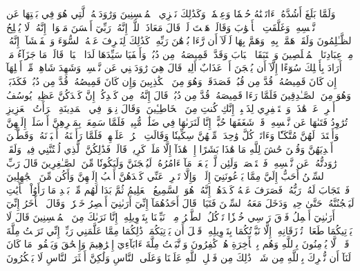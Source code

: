 وَلَمَّا بَلَغَ أَشُدَّهُۥٓ ءَاتَيۡنَٰهُ حُكۡمٗا وَعِلۡمٗاۚ وَكَذَٰلِكَ نَجۡزِي ٱلۡمُحۡسِنِينَ
وَرَٰوَدَتۡهُ ٱلَّتِي هُوَ فِي بَيۡتِهَا عَن نَّفۡسِهِۦ وَغَلَّقَتِ ٱلۡأَبۡوَٰبَ وَقَالَتۡ هَيۡتَ لَكَۚ قَالَ مَعَاذَ ٱللَّهِۖ إِنَّهُۥ رَبِّيٓ أَحۡسَنَ مَثۡوَايَۖ إِنَّهُۥ لَا يُفۡلِحُ ٱلظَّـٰلِمُونَ
وَلَقَدۡ هَمَّتۡ بِهِۦۖ وَهَمَّ بِهَا لَوۡلَآ أَن رَّءَا بُرۡهَٰنَ رَبِّهِۦۚ كَذَٰلِكَ لِنَصۡرِفَ عَنۡهُ ٱلسُّوٓءَ وَٱلۡفَحۡشَآءَۚ إِنَّهُۥ مِنۡ عِبَادِنَا ٱلۡمُخۡلَصِينَ
وَٱسۡتَبَقَا ٱلۡبَابَ وَقَدَّتۡ قَمِيصَهُۥ مِن دُبُرٖ وَأَلۡفَيَا سَيِّدَهَا لَدَا ٱلۡبَابِۚ قَالَتۡ مَا جَزَآءُ مَنۡ أَرَادَ بِأَهۡلِكَ سُوٓءًا إِلَّآ أَن يُسۡجَنَ أَوۡ عَذَابٌ أَلِيمٞ
قَالَ هِيَ رَٰوَدَتۡنِي عَن نَّفۡسِيۚ وَشَهِدَ شَاهِدٞ مِّنۡ أَهۡلِهَآ إِن كَانَ قَمِيصُهُۥ قُدَّ مِن قُبُلٖ فَصَدَقَتۡ وَهُوَ مِنَ ٱلۡكَٰذِبِينَ
وَإِن كَانَ قَمِيصُهُۥ قُدَّ مِن دُبُرٖ فَكَذَبَتۡ وَهُوَ مِنَ ٱلصَّـٰدِقِينَ
فَلَمَّا رَءَا قَمِيصَهُۥ قُدَّ مِن دُبُرٖ قَالَ إِنَّهُۥ مِن كَيۡدِكُنَّۖ إِنَّ كَيۡدَكُنَّ عَظِيمٞ
يُوسُفُ أَعۡرِضۡ عَنۡ هَٰذَاۚ وَٱسۡتَغۡفِرِي لِذَنۢبِكِۖ إِنَّكِ كُنتِ مِنَ ٱلۡخَاطِـِٔينَ
۞وَقَالَ نِسۡوَةٞ فِي ٱلۡمَدِينَةِ ٱمۡرَأَتُ ٱلۡعَزِيزِ تُرَٰوِدُ فَتَىٰهَا عَن نَّفۡسِهِۦۖ قَدۡ شَغَفَهَا حُبًّاۖ إِنَّا لَنَرَىٰهَا فِي ضَلَٰلٖ مُّبِينٖ
فَلَمَّا سَمِعَتۡ بِمَكۡرِهِنَّ أَرۡسَلَتۡ إِلَيۡهِنَّ وَأَعۡتَدَتۡ لَهُنَّ مُتَّكَـٔٗا وَءَاتَتۡ كُلَّ وَٰحِدَةٖ مِّنۡهُنَّ سِكِّينٗا وَقَالَتِ ٱخۡرُجۡ عَلَيۡهِنَّۖ فَلَمَّا رَأَيۡنَهُۥٓ أَكۡبَرۡنَهُۥ وَقَطَّعۡنَ أَيۡدِيَهُنَّ وَقُلۡنَ حَٰشَ لِلَّهِ مَا هَٰذَا بَشَرًا إِنۡ هَٰذَآ إِلَّا مَلَكٞ كَرِيمٞ
قَالَتۡ فَذَٰلِكُنَّ ٱلَّذِي لُمۡتُنَّنِي فِيهِۖ وَلَقَدۡ رَٰوَدتُّهُۥ عَن نَّفۡسِهِۦ فَٱسۡتَعۡصَمَۖ وَلَئِن لَّمۡ يَفۡعَلۡ مَآ ءَامُرُهُۥ لَيُسۡجَنَنَّ وَلَيَكُونٗا مِّنَ ٱلصَّـٰغِرِينَ
قَالَ رَبِّ ٱلسِّجۡنُ أَحَبُّ إِلَيَّ مِمَّا يَدۡعُونَنِيٓ إِلَيۡهِۖ وَإِلَّا تَصۡرِفۡ عَنِّي كَيۡدَهُنَّ أَصۡبُ إِلَيۡهِنَّ وَأَكُن مِّنَ ٱلۡجَٰهِلِينَ
فَٱسۡتَجَابَ لَهُۥ رَبُّهُۥ فَصَرَفَ عَنۡهُ كَيۡدَهُنَّۚ إِنَّهُۥ هُوَ ٱلسَّمِيعُ ٱلۡعَلِيمُ
ثُمَّ بَدَا لَهُم مِّنۢ بَعۡدِ مَا رَأَوُاْ ٱلۡأٓيَٰتِ لَيَسۡجُنُنَّهُۥ حَتَّىٰ حِينٖ
وَدَخَلَ مَعَهُ ٱلسِّجۡنَ فَتَيَانِۖ قَالَ أَحَدُهُمَآ إِنِّيٓ أَرَىٰنِيٓ أَعۡصِرُ خَمۡرٗاۖ وَقَالَ ٱلۡأٓخَرُ إِنِّيٓ أَرَىٰنِيٓ أَحۡمِلُ فَوۡقَ رَأۡسِي خُبۡزٗا تَأۡكُلُ ٱلطَّيۡرُ مِنۡهُۖ نَبِّئۡنَا بِتَأۡوِيلِهِۦٓۖ إِنَّا نَرَىٰكَ مِنَ ٱلۡمُحۡسِنِينَ
قَالَ لَا يَأۡتِيكُمَا طَعَامٞ تُرۡزَقَانِهِۦٓ إِلَّا نَبَّأۡتُكُمَا بِتَأۡوِيلِهِۦ قَبۡلَ أَن يَأۡتِيَكُمَاۚ ذَٰلِكُمَا مِمَّا عَلَّمَنِي رَبِّيٓۚ إِنِّي تَرَكۡتُ مِلَّةَ قَوۡمٖ لَّا يُؤۡمِنُونَ بِٱللَّهِ وَهُم بِٱلۡأٓخِرَةِ هُمۡ كَٰفِرُونَ
وَٱتَّبَعۡتُ مِلَّةَ ءَابَآءِيٓ إِبۡرَٰهِيمَ وَإِسۡحَٰقَ وَيَعۡقُوبَۚ مَا كَانَ لَنَآ أَن نُّشۡرِكَ بِٱللَّهِ مِن شَيۡءٖۚ ذَٰلِكَ مِن فَضۡلِ ٱللَّهِ عَلَيۡنَا وَعَلَى ٱلنَّاسِ وَلَٰكِنَّ أَكۡثَرَ ٱلنَّاسِ لَا يَشۡكُرُونَ
